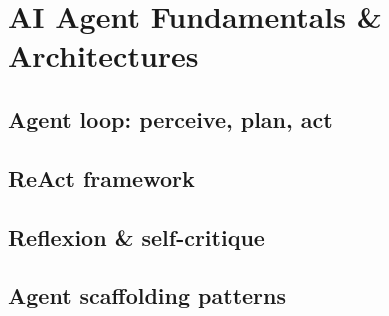 
\section{AI Agent Fundamentals \& Architectures}

\subsection{Agent loop: perceive, plan, act}


\subsection{ReAct framework}


\subsection{Reflexion \& self-critique}


\subsection{Agent scaffolding patterns}



